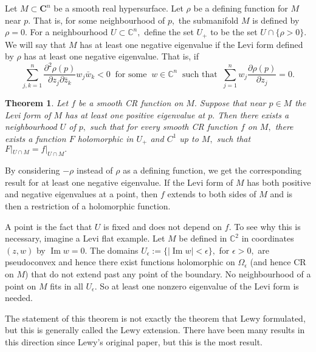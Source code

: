 \documentclass[12pt]{article}
\theoremstyle{theorem}
\newtheorem*{thm}{Theorem}
\theoremstyle{definition}
\theoremstyle{remark}
\begin{document}
Let $M \subset {\mathbf{C}}^n$ be a smooth real hypersurface.
Let $\rho$ be a defining function for $M$ near $p.$  That is, for some neighbourhood
of $p,$ the submanifold $M$ is defined by $\rho = 0 .$
For a neighbourhood $U \subset {\mathbb{C}}^n,$ define the set
$U_+$ to be the set $U \cap \{ \rho > 0 \} .$  We will say that 
$M$ has at least one negative eigenvalue if the Levi form defined by $\rho$ has at least one negative
eigenvalue.  That is, if
\begin{equation*}
\sum_{j,k=1}^n \frac{\partial^2 \rho (p)}{\partial z_j \partial \bar{z}_k} w_j \bar{w}_k < 0
~\text{ for some }~
w \in {\mathbb{C}}^n
~\text{ such that }~
\sum_{j=1}^n w_j \frac{\partial \rho(p)}{\partial z_j} = 0 .
\end{equation*}

\begin{thm}
Let $f$ be a smooth CR function on $M.$  Suppose that
near $p \in M$ the Levi form of $M$ has at least one positive eigenvalue at $p.$  Then there exists a
neighbourhood $U$ of $p,$ such that for every smooth CR function $f$ on $M,$ there exists a
function $F$ holomorphic in $U_+$ and $C^1$ up to $M,$ such that $F|_{U \cap M} = f|_{U \cap M}.$
\end{thm}

By considering $-\rho$ instead of $\rho$ as a defining function, we get the corresponding result for
at least one negative eigenvalue. 
If the Levi form of $M$ has both positive and negative eigenvalues at a point, then $f$ extends to both sides
of $M$ and is then a restriction of a holomorphic function.

A  point is the fact that $U$ is fixed and does not depend on $f.$  To see why this is necessary, imagine a Levi flat example.  Let $M$ be defined in ${\mathbb{C}}^2$ in coordinates $(z,w)$ by $\operatorname{Im} w = 0.$  The domains
$U_\epsilon := \{ \lvert \operatorname{Im} w \rvert < \epsilon \},$ for $\epsilon > 0,$ are pseudoconvex and hence
there exist functions
holomorphic on $\Omega_\epsilon$ (and hence CR on $M$) that do not extend past any point of the boundary.  No neighbourhood of a point on $M$ fits in all $U_\epsilon .$  So at least one nonzero eigenvalue of the Levi form
is needed.

The statement of this theorem is not exactly the theorem that Lewy formulated\cite{lewy}, but this is generally called the Lewy extension.  There have been many results
in this direction since Lewy's original paper, but this is the most  result.
\end{document}
